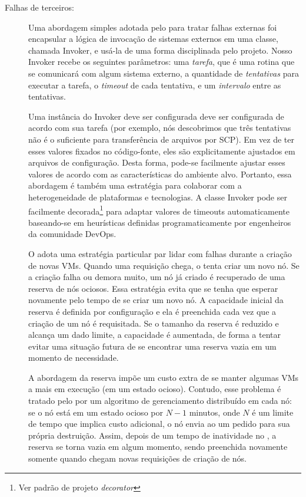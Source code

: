 \begin{description}
\item [Falhas de terceiros:]


Uma abordagem simples adotada pelo \ee para tratar falhas externas
foi encapsular a lógica de invocação de sistemas externos em uma classe, 
chamada \textsf{Invoker}, e usá-la de uma forma disciplinada pelo projeto.
Nosso \textsf{Invoker} recebe os seguintes parâmetros:
uma \emph{tarefa}, que é uma rotina que se comunicará com algum sistema externo,
a quantidade de \emph{tentativas} para executar a tarefa,
o \emph{timeout} de cada tentativa, e um \emph{intervalo} entre as tentativas.


Uma instância do \textsf{Invoker} deve ser configurada deve ser configurada
de acordo com sua tarefa (por exemplo, nós descobrimos que três tentativas
não é o suficiente para transferência de arquivos por SCP).
Em vez de ter esses valores fixados no código-fonte, eles são explicitamente
ajustados em arquivos de configuração.
Desta forma, pode-se facilmente ajustar esses valores de acordo com 
as características do ambiente alvo.
Portanto, essa abordagem é também uma estratégia para colaborar 
com a heterogeneidade de plataformas e tecnologias.
A classe \textsf{Invoker} pode ser facilmente decorada\footnote{Ver padrão de projeto \emph{decorator}} para adaptar valores de timeouts automaticamente
baseando-se em heurísticas definidas programaticamente por engenheiros 
da comunidade DevOps.

O \ee adota uma estratégia particular par lidar com falhas durante a criação de novas VMs.
Quando uma requisição chega, o \ee tenta criar um novo nó.
Se a criação falha ou demora muito, um nó já criado é recuperado de uma reserva de nós ociosos.
Essa estratégia evita que se tenha que esperar novamente pelo tempo de se criar um novo nó.
A capacidade inicial da reserva é definida por configuração
e ela é preenchida cada vez que a criação de um nó é requisitada.
Se o tamanho da reserva é reduzido e alcança um dado limite,
a capacidade é aumentada, de forma a tentar evitar uma situação futura
de se encontrar uma reserva vazia em um momento de necessidade.

A abordagem da reserva impõe um custo extra de se manter algumas VMs a mais
em execução (em um estado ocioso). Contudo, esse problema é tratado
pelo \ee por um algoritmo de gerenciamento distribuído em cada nó:
se o nó está em um estado ocioso por $N-1$ minutos, onde $N$ é um limite
de tempo que implica custo adicional, o nó envia ao \ee um pedido para 
sua própria destruição. Assim, depois de um tempo de inatividade no \ee,
a reserva se torna vazia em algum momento, sendo preenchida novamente
somente quando chegam novas requisições de criação de nós.


\end{description}
